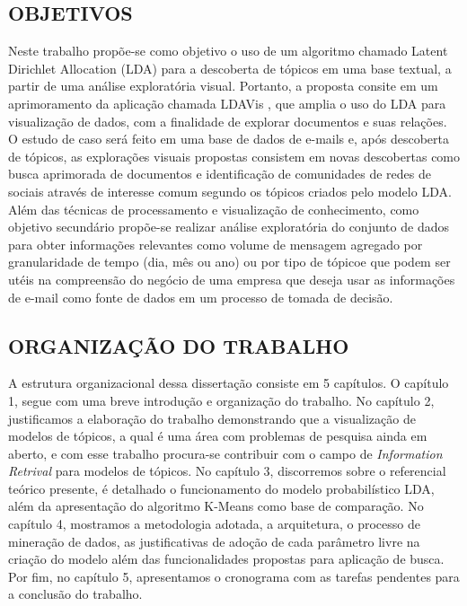 \documentclass[12pt,a4paper]{article}
\begin{document}
\subsection{OBJETIVOS} \label{sec:objetivo}

Neste trabalho propõe-se como objetivo o uso de um algoritmo chamado Latent Dirichlet Allocation (LDA) \cite{blei2003latent} para a descoberta de tópicos em uma base textual, a partir de uma análise exploratória visual. Portanto, a proposta consite em um aprimoramento da aplicação chamada LDAVis  \cite{sievert2014ldavis}, que amplia o uso do LDA para visualização de dados, com a finalidade de explorar documentos e suas relações. O estudo de caso será feito em uma base de dados de e-mails e, após descoberta de tópicos, as explorações visuais propostas consistem em novas descobertas como busca aprimorada de documentos e identificação de  comunidades de redes de sociais através de interesse comum segundo os tópicos criados pelo modelo LDA. Além das técnicas de processamento e visualização de conhecimento, como objetivo secundário propõe-se realizar análise exploratória do conjunto de dados para obter informações relevantes como volume de mensagem agregado por granularidade de tempo (dia, mês ou ano) ou por tipo de tópicoe que podem ser utéis na compreensão do negócio de uma empresa que deseja usar as informações de e-mail como fonte de dados em um processo de tomada de decisão.


\subsection{ORGANIZAÇÃO DO TRABALHO} \label{sec:organizacao}

 A estrutura organizacional dessa dissertação consiste em 5 capítulos. O capítulo 1, segue com uma breve introdução e organização do trabalho. 
  No capítulo 2, justificamos a elaboração do trabalho demonstrando que a visualização de modelos de tópicos, a qual é uma área com problemas de pesquisa ainda em aberto, 
  e com esse trabalho procura-se  contribuir com o campo de \textit{Information Retrival} para modelos de tópicos. No capítulo 3, discorremos sobre o referencial teórico presente, 
  é detalhado o funcionamento do modelo probabilístico LDA, além da apresentação do algoritmo K-Means como base de comparação. No capítulo 4, mostramos a metodologia adotada, 
  a arquitetura, o processo de mineração de dados, as justificativas de adoção de cada parâmetro livre na criação do modelo além das funcionalidades propostas para
  aplicação de busca. Por fim, no capítulo 5, apresentamos o cronograma com as tarefas pendentes para a conclusão do trabalho.
\end{document}
